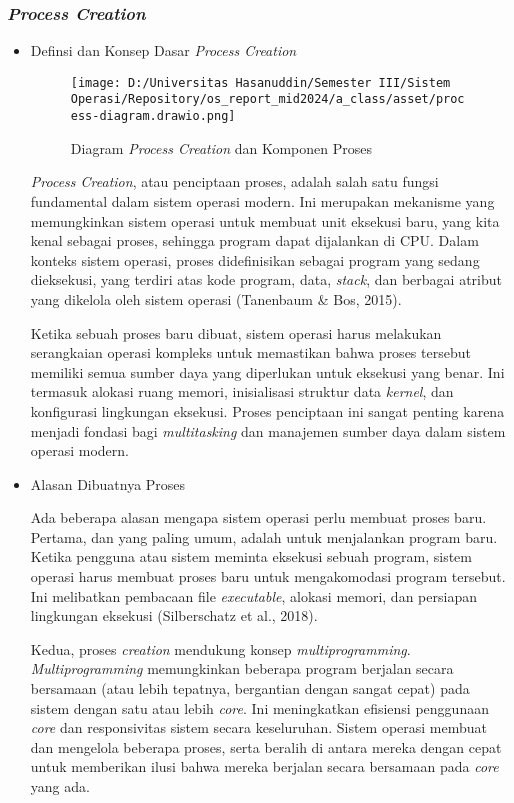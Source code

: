 \documentclass[12pt]{article}
\begin{document}
\subsubsection{\textit{Process Creation}}
\begin{itemize}
    \item Definsi dan Konsep Dasar \textit{Process Creation}
    
    \begin{figure}[h]
        \centering
        \texttt{[image: D:/Universitas Hasanuddin/Semester III/Sistem Operasi/Repository/os\_report\_mid2024/a\_class/asset/process-diagram.drawio.png]}
        \caption{Diagram \textit{Process Creation} dan Komponen Proses}
    \end{figure}
    
    \textit{Process Creation}, atau penciptaan proses, adalah 
    salah satu fungsi fundamental dalam sistem operasi 
    modern. Ini merupakan mekanisme yang memungkinkan sistem 
    operasi untuk membuat unit eksekusi baru, yang kita kenal 
    sebagai proses, sehingga program dapat dijalankan di CPU. 
    Dalam konteks sistem operasi, proses didefinisikan sebagai 
    program yang sedang dieksekusi, yang terdiri atas kode 
    program, data, \textit{stack}, dan berbagai atribut 
    yang dikelola oleh sistem operasi (Tanenbaum \& Bos, 2015).

    Ketika sebuah proses baru dibuat, sistem operasi harus 
    melakukan serangkaian operasi kompleks untuk memastikan 
    bahwa proses tersebut memiliki semua sumber daya yang 
    diperlukan untuk eksekusi yang benar. Ini termasuk alokasi 
    ruang memori, inisialisasi struktur data \textit{kernel}, dan 
    konfigurasi lingkungan eksekusi. Proses penciptaan ini 
    sangat penting karena menjadi fondasi bagi \textit{multitasking} 
    dan manajemen sumber daya dalam sistem operasi modern.

    \item Alasan Dibuatnya Proses
    
    Ada beberapa alasan mengapa sistem operasi perlu membuat 
    proses baru. Pertama, dan yang paling umum, adalah untuk 
    menjalankan program baru. Ketika pengguna atau sistem 
    meminta eksekusi sebuah program, sistem operasi harus 
    membuat proses baru untuk mengakomodasi program tersebut. 
    Ini melibatkan pembacaan file \textit{executable}, alokasi 
    memori, dan persiapan lingkungan eksekusi 
    (Silberschatz et al., 2018).

    Kedua, proses \textit{creation} mendukung konsep 
    \textit{multiprogramming}. \textit{Multiprogramming} 
    memungkinkan beberapa program berjalan secara bersamaan 
    (atau lebih tepatnya, bergantian dengan sangat cepat) pada 
    sistem dengan satu atau lebih \textit{core}. Ini meningkatkan 
    efisiensi penggunaan \textit{core} dan responsivitas sistem 
    secara keseluruhan. Sistem operasi membuat dan mengelola 
    beberapa proses, serta beralih di antara mereka dengan cepat 
    untuk memberikan ilusi bahwa mereka berjalan secara bersamaan 
    pada \textit{core} yang ada.


\end{itemize}
\end{document}
